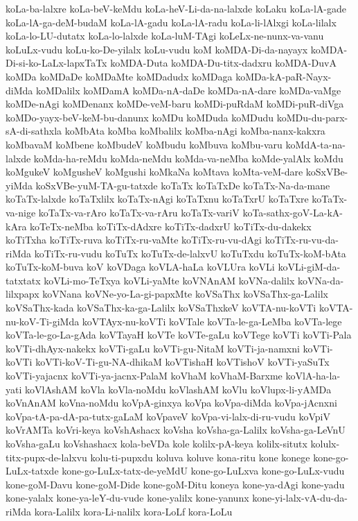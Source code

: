 {koLa-ba-lalxre
koLa-beV-keMdu
koLa-heV-Li-da-na-lalxde
koLaku
koLa-lA-gade
koLa-lA-ga-deM-budaM
koLa-lA-gadu
koLa-lA-radu
koLa-li-lAlxgi
koLa-lilalx
koLa-lo-LU-dutatx
koLa-lo-lalxde
koLa-luM-TAgi
koLeLx-ne-nunx-va-vanu
koLuLx-vudu
koLu-ko-De-yilalx
koLu-vudu
koM
koMDA-Di-da-nayayx
koMDA-Di-si-ko-LaLx-lapxTaTx
koMDA-Duta
koMDA-Du-titx-dadxru
koMDA-DuvA
koMDa
koMDaDe
koMDaMte
koMDadudx
koMDaga
koMDa-kA-paR-Nayx-diMda
koMDalilx
koMDamA
koMDa-nA-daDe
koMDa-nA-dare
koMDa-vaMge
koMDe-nAgi
koMDenanx
koMDe-veM-baru
koMDi-puRdaM
koMDi-puR-diVga
koMDo-yayx-beV-keM-bu-danunx
koMDu
koMDuda
koMDudu
koMDu-du-parx-sA-di-sathxla
koMbAta
koMba
koMbalilx
koMba-nAgi
koMba-nanx-kakxra
koMbavaM
koMbene
koMbudeV
koMbudu
koMbuva
koMbu-varu
koMdA-ta-na-lalxde
koMda-ha-reMdu
koMda-neMdu
koMda-va-neMba
koMde-yalAlx
koMdu
koMgukeV
koMgusheV
koMgushi
koMkaNa
koMtava
koMta-veM-dare
koSxVBe-yiMda
koSxVBe-yuM-TA-gu-tatxde
koTaTx
koTaTxDe
koTaTx-Na-da-mane
koTaTx-lalxde
koTaTxlilx
koTaTx-nAgi
koTaTxnu
koTaTxrU
koTaTxre
koTaTx-va-nige
koTaTx-va-rAro
koTaTx-va-rAru
koTaTx-variV
koTa-sathx-goV-La-kA-kAra
koTeTx-neMba
koTiTx-dAdxre
koTiTx-dadxrU
koTiTx-du-dakekx
koTiTxha
koTiTx-ruva
koTiTx-ru-vaMte
koTiTx-ru-vu-dAgi
koTiTx-ru-vu-da-riMda
koTiTx-ru-vudu
koTuTx
koTuTx-de-lalxvU
koTuTxdu
koTuTx-koM-bAta
koTuTx-koM-buva
koV
koVDaga
koVLA-haLa
koVLUra
koVLi
koVLi-giM-da-tatxtatx
koVLi-mo-TeTxya
koVLi-yaMte
koVNAnAM
koVNa-dalilx
koVNa-da-lilxpapx
koVNana
koVNe-yo-La-gi-papxMte
koVSaThx
koVSaThx-ga-Lalilx
koVSaThx-kada
koVSaThx-ka-ga-Lalilx
koVSaThxkeV
koVTA-nu-koVTi
koVTA-nu-koV-Ti-giMda
koVTAyx-nu-koVTi
koVTale
koVTa-le-ga-LeMba
koVTa-lege
koVTa-le-go-La-gAda
koVTayaH
koVTe
koVTe-gaLu
koVTege
koVTi
koVTi-Pala
koVTi-dhAyx-nakekx
koVTi-gaLu
koVTi-gu-NitaM
koVTi-ja-namxni
koVTi-koVTi
koVTi-koV-Ti-gu-NA-dhikaM
koVTishaH
koVTishoV
koVTi-yaSuTx
koVTi-yajacnx
koVTi-ya-jacnx-PalaM
koVhaM
koVhaM-Barxme
koVlA-ha-la-yati
koVlAshAM
koVla
koVla-noMdu
koVlashAM
koVlu
koVlupx-li-yAMDa
koVnAnAM
koVna-noMdu
koVpA-ginxya
koVpa
koVpa-diMda
koVpa-jAcnxni
koVpa-tA-pa-dA-pa-tutx-gaLaM
koVpaveV
koVpa-vi-lalx-di-ru-vudu
koVpiV
koVrAMTa
koVri-keya
koVshAshacx
koVsha
koVsha-ga-Lalilx
koVsha-ga-LeVnU
koVsha-gaLu
koVshashacx
kola-beVDa
kole
kolilx-pA-keya
kolilx-situtx
kolulx-titx-pupx-de-lalxvu
kolu-ti-pupxdu
koluva
koluve
kona-ritu
kone
konege
kone-go-LuLx-tatxde
kone-go-LuLx-tatx-de-yeMdU
kone-go-LuLxva
kone-go-LuLx-vudu
kone-goM-Davu
kone-goM-Dide
kone-goM-Ditu
koneya
kone-ya-dAgi
kone-yadu
kone-yalalx
kone-ya-leY-du-vude
kone-yalilx
kone-yanunx
kone-yi-lalx-vA-du-da-riMda
kora-Lalilx
kora-Li-nalilx
kora-LoLf
kora-LoLu
}
